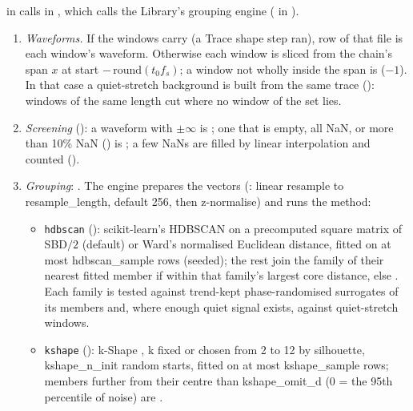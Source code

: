  in  calls  in
, which calls the Library's grouping engine
( in ).
\begin{enumerate}
\item \emph{Waveforms.} If the windows carry  (a Trace shape step ran), row
   of that file is each window's waveform. Otherwise each window is sliced from the
  chain's span $x$ at start $-\,\mathrm{round}(t_0 f_s)$; a window not wholly inside the span is
   ($-1$). In that case a quiet-stretch background is built from the same trace
  (): windows of the same length cut where no window of the set lies.
\item \emph{Screening} (): a waveform with $\pm\infty$ is ;
  one that is empty, all NaN, or more than 10\% NaN () is
  ; a few NaNs are filled by linear interpolation and counted
  ().
\item \emph{Grouping}: . The engine prepares the vectors (: linear resample to
  resample\_length, default 256, then z-normalise) and runs the method:
  \begin{itemize}
  \item \texttt{hdbscan} (): scikit-learn's HDBSCAN
    \citep{campello2013density} on a precomputed square matrix of SBD$/2$ (default) or Ward's
    normalised Euclidean distance, fitted on at most hdbscan\_sample rows (seeded); the rest join
    the family of their nearest fitted member if within that family's largest core distance, else
    . Each family is tested against trend-kept phase-randomised
    surrogates of its members and, where enough quiet signal exists, against quiet-stretch windows.
  \item \texttt{kshape} (): k-Shape \citep{paparrizos2015kshape}, k fixed
    or chosen from 2 to 12 by silhouette, kshape\_n\_init random starts, fitted on at most
    kshape\_sample rows; members further from their centre than kshape\_omit\_d (0 = the 95th
    percentile of noise) are .

\end{itemize}
\end{enumerate}

